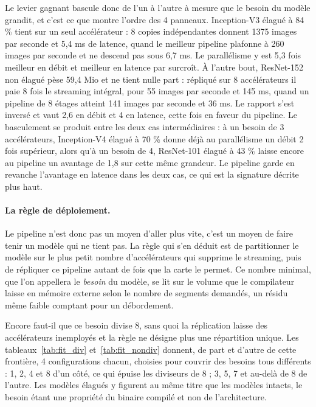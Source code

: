 \documentclass[11pt,a4paper]{report}
\begin{document}
Le levier gagnant bascule donc de l'un à l'autre à mesure que le besoin du modèle grandit, et c'est ce que montre l'ordre des 4 panneaux. Inception-V3 élagué à 84 \% tient sur un seul accélérateur : 8 copies indépendantes donnent 1375 images par seconde et 5,4 ms de latence, quand le meilleur pipeline plafonne à 260 images par seconde et ne descend pas sous 6,7 ms. Le parallélisme y est 5,3 fois meilleur en débit et meilleur en latence par surcroît. À l'autre bout, ResNet-152 non élagué pèse 59,4 Mio et ne tient nulle part : répliqué sur 8 accélérateurs il paie 8 fois le streaming intégral, pour 55 images par seconde et 145 ms, quand un pipeline de 8 étages atteint 141 images par seconde et 36 ms. Le rapport s'est inversé et vaut 2,6 en débit et 4 en latence, cette fois en faveur du pipeline. Le basculement se produit entre les deux cas intermédiaires : à un besoin de 3 accélérateurs, Inception-V4 élagué à 70 \% donne déjà au parallélisme un débit 2 fois supérieur, alors qu'à un besoin de 4, ResNet-101 élagué à 43 \% laisse encore au pipeline un avantage de 1,8 sur cette même grandeur. Le pipeline garde en revanche l'avantage en latence dans les deux cas, ce qui est la signature décrite plus haut.

\paragraph{La règle de déploiement.} Le pipeline n'est donc pas un moyen d'aller plus vite, c'est un moyen de faire tenir un modèle qui ne tient pas. La règle qui s'en déduit est de partitionner le modèle sur le plus petit nombre d'accélérateurs qui supprime le streaming, puis de répliquer ce pipeline autant de fois que la carte le permet. Ce nombre minimal, que l'on appellera le \emph{besoin} du modèle, se lit sur le volume que le compilateur laisse en mémoire externe selon le nombre de segments demandés, un résidu même faible comptant pour un débordement.

Encore faut-il que ce besoin divise 8, sans quoi la réplication laisse des accélérateurs inemployés et la règle ne désigne plus une répartition unique. Les tableaux~\ref{tab:fit_div} et~\ref{tab:fit_nondiv} donnent, de part et d'autre de cette frontière, 4 configurations chacun, choisies pour couvrir des besoins tous différents : 1, 2, 4 et 8 d'un côté, ce qui épuise les diviseurs de 8 ; 3, 5, 7 et au-delà de 8 de l'autre. Les modèles élagués y figurent au même titre que les modèles intacts, le besoin étant une propriété du binaire compilé et non de l'architecture.
\end{document}
